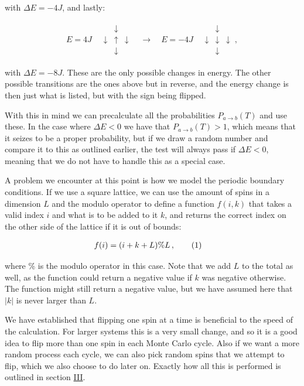 \documentclass[reprint,english,notitlepage]{revtex4-1}  %
\newcommand\numberthis{\addtocounter{equation}{1}\tag{\theequation}}
\begin{document}
with $\Delta E = -4J$, and lastly:

\begin{align*}
E = 4J \quad \begin{array}{ccc}
& \downarrow & \\
\downarrow & \uparrow & \downarrow \\
& \downarrow &
\end{array} \quad \to \quad E = -4J \quad \begin{array}{ccc}
& \downarrow & \\
\downarrow & \downarrow & \downarrow \\
& \downarrow &
\end{array} \, ,
\end{align*}

with $\Delta E = -8J$. These are the only possible changes in energy. The other possible transitions are the ones above but in reverse, and the energy change is then just what is listed, but with the sign being flipped. 

With this in mind we can precalculate all the probabilities $P_{a \to b} (T)$ and use these. In the case where $\Delta E < 0$ we have that $P_{a\to b} (T) > 1$, which means that it seizes to be a proper probability, but if we draw a random number and compare it to this as outlined earlier, the test will always pass if $\Delta E < 0$, meaning that we do not have to handle this as a special case.

A problem we encounter at this point is how we model the periodic boundary conditions. If we use a square lattice, we can use the amount of spins in a dimension $L$ and the modulo operator to define a function $f(i,k)$ that takes a valid index $i$ and what is to be added to it $k$, and returns the correct index on the other side of the lattice if it is out of bounds:

\begin{align*}
f(i) &= (i+k+L)\%L \, , \numberthis \label{eq:periodic}
\end{align*}

where \% is the modulo operator in this case. Note that we add $L$ to the total as well, as the function could return a negative value if $k$ was negative otherwise. The function might still return a negative value, but we have assumed here that $|k|$ is never larger than $L$. 
 
We have established that flipping one spin at a time is beneficial to the speed of the calculation. For larger systems this is a very small change, and so it is a good idea to flip more than one spin in each Monte Carlo cycle. Also if we want a more random process each cycle, we can also pick random spins that we attempt to flip, which we also choose to do later on. Exactly how all this is performed is outlined in section \hyperref[sec:III]{III}.
\end{document}
